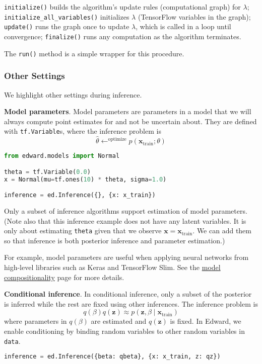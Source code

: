 \texttt{initialize()} builds the algorithm's update rules
(computational graph) for $\lambda$;
\texttt{initialize_all_variables()} initializes $\lambda$
(TensorFlow variables in the graph);
\texttt{update()} runs the graph once to update
$\lambda$, which is called in a loop until convergence;
\texttt{finalize()} runs any computation as the algorithm
terminates.

The \texttt{run()} method is a simple wrapper for this procedure.

\subsubsection{Other Settings}

We highlight other settings during inference.

\textbf{Model parameters}.
Model parameters are parameters in a model that we will always compute
point estimates for and not be uncertain about.
They are defined with \texttt{tf.Variable}s, where the inference
problem is
\begin{equation*}
\hat{\theta} \leftarrow^{\text{optimize}}
p(\mathbf{x}_{\text{train}}; \theta)
\end{equation*}

\begin{lstlisting}[language=Python]
from edward.models import Normal

theta = tf.Variable(0.0)
x = Normal(mu=tf.ones(10) * theta, sigma=1.0)

inference = ed.Inference({}, {x: x_train})
\end{lstlisting}

Only a subset of inference algorithms support estimation of model
parameters.
(Note also that this inference example does not have any latent
variables. It is only about estimating \texttt{theta} given that we
observe $\mathbf{x} = \mathbf{x}_{\text{train}}$. We can add them so
that inference is both posterior inference and parameter estimation.)

For example, model parameters are useful when applying neural networks
from high-level libraries such as Keras and TensorFlow Slim. See
the \href{/api/model-compositionality}{model compositionality} page
for more details.

\textbf{Conditional inference}.
In conditional inference, only a subset of the posterior is inferred
while the rest are fixed using other inferences. The inference
problem is
\begin{equation*}
q(\beta)q(\mathbf{z})\approx
p(\mathbf{z}, \beta\mid\mathbf{x}_{\text{train}})
\end{equation*}
where parameters in $q(\beta)$ are estimated and $q(\mathbf{z})$ is
fixed.
%
In Edward, we enable conditioning by binding random variables to other
random variables in \texttt{data}.
\begin{lstlisting}[language=Python]
inference = ed.Inference({beta: qbeta}, {x: x_train, z: qz})
\end{lstlisting}

